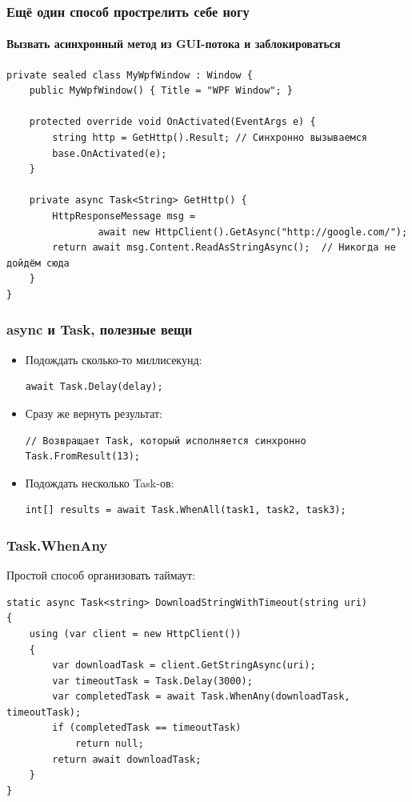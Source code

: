 \documentclass{../../slides-style}
\begin{document}
    \begin{frame}[fragile]
        \frametitle{Ещё один способ прострелить себе ногу}
        \framesubtitle{Вызвать асинхронный метод из GUI-потока и заблокироваться}
        \begin{footnotesize}
            \begin{verbatim}
private sealed class MyWpfWindow : Window {
    public MyWpfWindow() { Title = "WPF Window"; }

    protected override void OnActivated(EventArgs e) {
        string http = GetHttp().Result; // Синхронно вызываемся
        base.OnActivated(e);
    }

    private async Task<String> GetHttp() {
        HttpResponseMessage msg = 
                await new HttpClient().GetAsync("http://google.com/");
        return await msg.Content.ReadAsStringAsync();  // Никогда не дойдём сюда
    }
}
            \end{verbatim}
        \end{footnotesize}
    \end{frame}

    \begin{frame}[fragile]
        \frametitle{async и Task, полезные вещи}
        \begin{itemize}
            \item Подождать сколько-то миллисекунд:
            \begin{verbatim}
await Task.Delay(delay);
            \end{verbatim}

            \item Сразу же вернуть результат:
            \begin{verbatim}
// Возвращает Task, который исполняется синхронно
Task.FromResult(13);
            \end{verbatim}

            \item Подождать несколько Task-ов:
            \begin{verbatim}
int[] results = await Task.WhenAll(task1, task2, task3);
            \end{verbatim}
        \end{itemize}
    \end{frame}

    \begin{frame}[fragile]
        \frametitle{Task.WhenAny}
        Простой способ организовать таймаут:
        \begin{small}
            \begin{verbatim}
static async Task<string> DownloadStringWithTimeout(string uri)
{
    using (var client = new HttpClient())
    {
        var downloadTask = client.GetStringAsync(uri);
        var timeoutTask = Task.Delay(3000);
        var completedTask = await Task.WhenAny(downloadTask, timeoutTask);
        if (completedTask == timeoutTask)
            return null;
        return await downloadTask;
    }
}
            \end{verbatim}
        \end{small}
    \end{frame}
\end{document}
